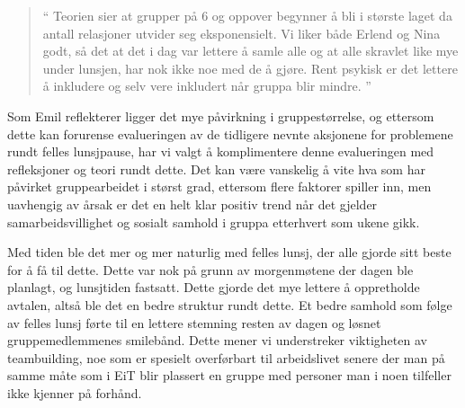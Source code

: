 \begin{quote}``
Teorien sier at grupper på 6 og oppover begynner å bli i største laget da antall relasjoner utvider seg eksponensielt. Vi liker både Erlend og Nina godt, så det at det i dag var lettere å samle alle og at alle skravlet like mye under lunsjen, har nok ikke noe med de å gjøre. Rent psykisk er det lettere å inkludere og selv vere inkludert når gruppa blir mindre.
''\end{quote} 

Som Emil reflekterer ligger det mye påvirkning i gruppestørrelse, og ettersom dette kan forurense evalueringen av de tidligere nevnte aksjonene for problemene rundt felles lunsjpause, har vi valgt å komplimentere denne evalueringen med refleksjoner og teori rundt dette. Det kan være vanskelig å vite hva som har påvirket gruppearbeidet i størst grad, ettersom flere faktorer spiller inn, men uavhengig av årsak er det en helt klar positiv trend når det gjelder samarbeidsvillighet og sosialt samhold i gruppa etterhvert som ukene gikk.

Med tiden ble det mer og mer naturlig med felles lunsj, der alle gjorde sitt beste for å få til dette. Dette var nok på grunn av morgenmøtene der dagen ble planlagt, og lunsjtiden fastsatt. Dette gjorde det mye lettere å oppretholde avtalen, altså ble det en bedre struktur rundt dette. Et bedre samhold som følge av felles lunsj førte til en lettere stemning resten av dagen og løsnet gruppemedlemmenes smilebånd. Dette mener vi understreker viktigheten av teambuilding, noe som er spesielt overførbart til arbeidslivet senere der man på samme måte som i EiT blir plassert en gruppe med personer man i noen tilfeller ikke kjenner på forhånd. 
